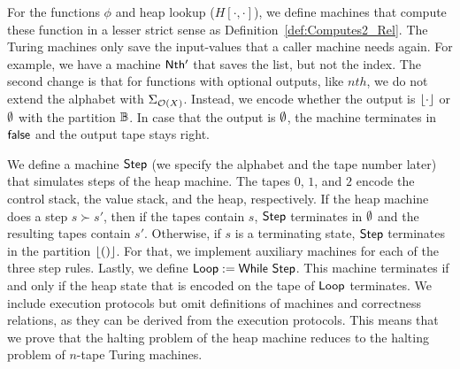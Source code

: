 For the functions $\phi$ and heap lookup ($H[\cdot, \cdot]$), we define machines that compute these function in a lesser strict sense as
Definition~\ref{def:Computes2_Rel}.  The Turing machines only save the input-values that a caller machine needs again.  For example, we have a machine
$\mathsf{Nth'}$ that saves the list, but not the index.  The second change is that for functions with optional outputs, like $nth$, we do not extend the
alphabet with $\Sigma_{\mathcal{O}(X)}$.  Instead, we encode whether the output is $\left\lfloor {\cdot} \right\rfloor$ or $\emptyset$ with the partition $\mathbb{B}$.  In case that the
output is $\emptyset$, the machine terminates in $\mathsf{false}$ and the output tape stays right.

We define a machine $\mathsf{Step}$ (we specify the alphabet and the tape number later) that simulates steps of the heap machine.  The tapes $0$, $1$, and
$2$ encode the control stack, the value stack, and the heap, respectively.  If the heap machine does a step $s \succ s'$, then if the tapes contain
$s$, $\mathsf{Step}$ terminates in $\emptyset$ and the resulting tapes contain $s'$.  Otherwise, if $s$ is a terminating state, $\mathsf{Step}$ terminates in the
partition $\left\lfloor {\ensuremath{\mathsf{()}}} \right\rfloor$.  For that, we implement auxiliary machines for each of the three step rules.  Lastly, we define
$\mathsf{Loop} := \mathsf{While}~\mathsf{Step}$.  This machine terminates if and only if the heap state that is encoded on the tape of $\mathsf{Loop}$ terminates.  We
include execution protocols but omit definitions of machines and correctness relations, as they can be derived from the execution protocols.  This
means that we prove that the halting problem of the heap machine reduces to the halting problem of $n$-tape Turing machines.





